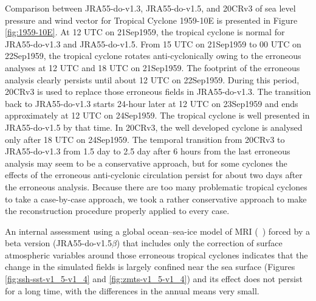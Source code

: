 \documentclass[dvipdfmx]{elsarticle_mod}
\begin{document}
Comparison between JRA55-do-v1.3, JRA55-do-v1.5, and 20CRv3 of sea level pressure and wind vector for Tropical Cyclone 1959-10E is presented in Figure \ref{fig:1959-10E}. At 12 UTC on 21Sep1959, the tropical cyclone is normal for JRA55-do-v1.3 and JRA55-do-v1.5. From 15 UTC on 21Sep1959 to 00 UTC on 22Sep1959, the tropical cyclone rotates anti-cyclonically owing to the erroneous analyses at 12 UTC and 18 UTC on 21Sep1959. The footprint of the erroneous analysis clearly persists until about 12 UTC on 22Sep1959. During this period, 20CRv3 is used to replace those erroneous fields in JRA55-do-v1.3. The transition back to JRA55-do-v1.3 starts 24-hour later at 12 UTC on 23Sep1959 and ends approximately at 12 UTC on 24Sep1959. The tropical cyclone is well presented in JRA55-do-v1.5 by that time. In 20CRv3, the well developed cyclone is analysed only after 18 UTC on 24Sep1959. The temporal transition from 20CRv3 to JRA55-do-v1.3 from 1.5 day to 2.5 day after 6 hours from the last erroneous analysis may seem to be a conservative approach, but for some cyclones the effects of the erroneous anti-cyclonic circulation persist for about two days after the erroneous analysis. Because there are too many problematic tropical cyclones to take a case-by-case approach, we took a rather conservative approach to make the reconstruction procedure properly applied to every case.

An internal assessment using a global ocean--sea-ice model of MRI (\citeauthor{Urakawa_et_al_2020}~\citeyear{Urakawa_et_al_2020}) forced by a beta version (JRA55-do-v1.5$\beta$) that includes only the correction of surface atmospheric variables around those erroneous tropical cyclones indicates that the change in the simulated fields is largely confined near the sea surface (Figures \ref{fig:ssh-sst-v1_5-v1_4} and \ref{fig:zmts-v1_5-v1_4}) and its effect does not persist for a long time, with the differences in the annual means very small.
\end{document}
